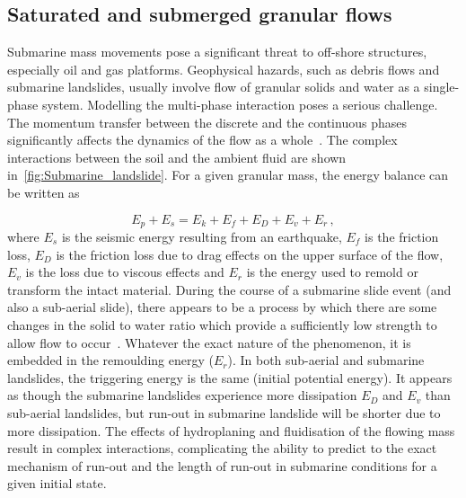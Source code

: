 \subsection{Saturated and submerged granular flows}
Submarine mass movements pose a significant threat to off-shore structures, 
especially oil and gas platforms. Geophysical hazards, such as debris flows and 
submarine landslides, usually involve flow of granular solids and water as a 
single-phase system. Modelling the multi-phase interaction poses a serious 
challenge. The momentum transfer between the discrete and the continuous phases 
significantly affects the dynamics of the flow as a whole~\citep{Topin2011}. 
The complex interactions between the soil and the ambient fluid are shown 
in~\cref{fig:Submarine_landslide}. For a given granular mass, the energy 
balance can be written as
%

\begin{equation}
E_p + E_s = E_k + E_f + E_D + E_v + E_r\,,
\end{equation}
where $E_s$ is the seismic energy resulting from an earthquake, $E_f$ is the 
friction loss, $E_D$ is the friction loss due to drag effects on the upper 
surface of the flow, $E_v$ is the loss due to viscous effects and $E_r$ is the 
energy used to remold or transform the intact material. During the course of a 
submarine slide event (and also a sub-aerial slide), there appears to be a 
process by which there are some changes in the solid to water ratio which 
provide a sufficiently low strength to allow flow to occur~\citep{Locat2002}. 
Whatever the exact nature of the phenomenon, it is embedded in the remoulding 
energy ($E_r$). In both sub-aerial and submarine landslides, the triggering 
energy is the same (initial potential energy). It appears as though the 
submarine landslides experience more dissipation $E_D$ and $E_v$ than 
sub-aerial landslides, but  run-out in submarine landslide will be 
shorter due to more dissipation. The effects of hydroplaning and fluidisation 
of the flowing mass result in complex interactions, complicating the ability to 
predict to the exact mechanism of run-out and the length of run-out in 
submarine conditions for a given initial state. 

